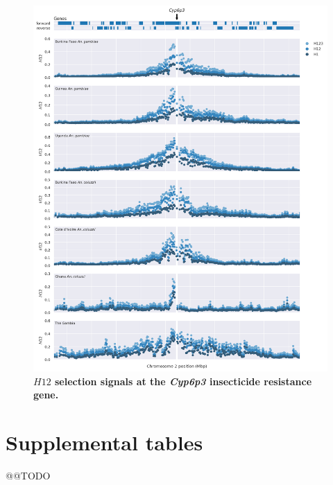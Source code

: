 \documentclass[a4paper,11pt,abstracton,hidelinks]{scrartcl}
\begin{document}
\begin{figure}[t!]
	\begin{center}
		\includegraphics*[width=1.1\linewidth,center]{artwork/locus_cyp6p3_h12.png}
	\end{center}
	\caption{
	\textbf{$H12$ selection signals at the \textit{Cyp6p3} insecticide resistance gene.} 
	} 
	\label{fig:locus_cyp6p3_h12}
\end{figure}


\clearpage

\section*{Supplemental tables}

@@TODO


\clearpage


\printbibliography
\end{document}

